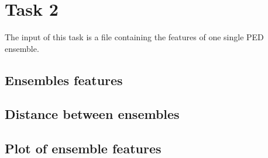 \section{Task 2}\label{sec:task2}

The input of this task is a file containing the features of one single PED ensemble.

\subsection{Ensembles features}



\subsection{Distance between ensembles}



\subsection{Plot of ensemble features}